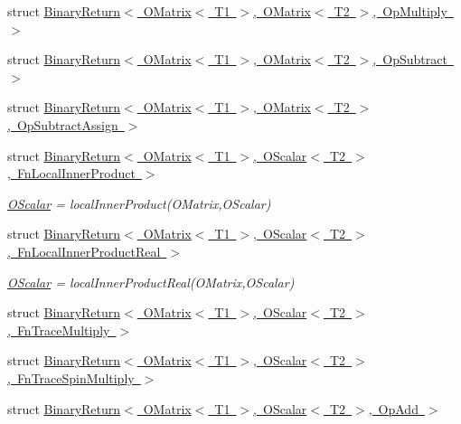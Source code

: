 \begin{DoxyCompactItemize}
\item 
struct \mbox{\hyperlink{structENSEM_1_1BinaryReturn_3_01OMatrix_3_01T1_01_4_00_01OMatrix_3_01T2_01_4_00_01OpMultiply_01_4}{Binary\+Return$<$ O\+Matrix$<$ T1 $>$, O\+Matrix$<$ T2 $>$, Op\+Multiply $>$}}
\item 
struct \mbox{\hyperlink{structENSEM_1_1BinaryReturn_3_01OMatrix_3_01T1_01_4_00_01OMatrix_3_01T2_01_4_00_01OpSubtract_01_4}{Binary\+Return$<$ O\+Matrix$<$ T1 $>$, O\+Matrix$<$ T2 $>$, Op\+Subtract $>$}}
\item 
struct \mbox{\hyperlink{structENSEM_1_1BinaryReturn_3_01OMatrix_3_01T1_01_4_00_01OMatrix_3_01T2_01_4_00_01OpSubtractAssign_01_4}{Binary\+Return$<$ O\+Matrix$<$ T1 $>$, O\+Matrix$<$ T2 $>$, Op\+Subtract\+Assign $>$}}
\item 
struct \mbox{\hyperlink{structENSEM_1_1BinaryReturn_3_01OMatrix_3_01T1_01_4_00_01OScalar_3_01T2_01_4_00_01FnLocalInnerProduct_01_4}{Binary\+Return$<$ O\+Matrix$<$ T1 $>$, O\+Scalar$<$ T2 $>$, Fn\+Local\+Inner\+Product $>$}}
\begin{DoxyCompactList}\small\item\em \mbox{\hyperlink{classENSEM_1_1OScalar}{O\+Scalar}} = local\+Inner\+Product(\+O\+Matrix,\+O\+Scalar) \end{DoxyCompactList}\item 
struct \mbox{\hyperlink{structENSEM_1_1BinaryReturn_3_01OMatrix_3_01T1_01_4_00_01OScalar_3_01T2_01_4_00_01FnLocalInnerProductReal_01_4}{Binary\+Return$<$ O\+Matrix$<$ T1 $>$, O\+Scalar$<$ T2 $>$, Fn\+Local\+Inner\+Product\+Real $>$}}
\begin{DoxyCompactList}\small\item\em \mbox{\hyperlink{classENSEM_1_1OScalar}{O\+Scalar}} = local\+Inner\+Product\+Real(\+O\+Matrix,\+O\+Scalar) \end{DoxyCompactList}\item 
struct \mbox{\hyperlink{structENSEM_1_1BinaryReturn_3_01OMatrix_3_01T1_01_4_00_01OScalar_3_01T2_01_4_00_01FnTraceMultiply_01_4}{Binary\+Return$<$ O\+Matrix$<$ T1 $>$, O\+Scalar$<$ T2 $>$, Fn\+Trace\+Multiply $>$}}
\item 
struct \mbox{\hyperlink{structENSEM_1_1BinaryReturn_3_01OMatrix_3_01T1_01_4_00_01OScalar_3_01T2_01_4_00_01FnTraceSpinMultiply_01_4}{Binary\+Return$<$ O\+Matrix$<$ T1 $>$, O\+Scalar$<$ T2 $>$, Fn\+Trace\+Spin\+Multiply $>$}}
\item 
struct \mbox{\hyperlink{structENSEM_1_1BinaryReturn_3_01OMatrix_3_01T1_01_4_00_01OScalar_3_01T2_01_4_00_01OpAdd_01_4}{Binary\+Return$<$ O\+Matrix$<$ T1 $>$, O\+Scalar$<$ T2 $>$, Op\+Add $>$}}

\end{DoxyCompactItemize}
